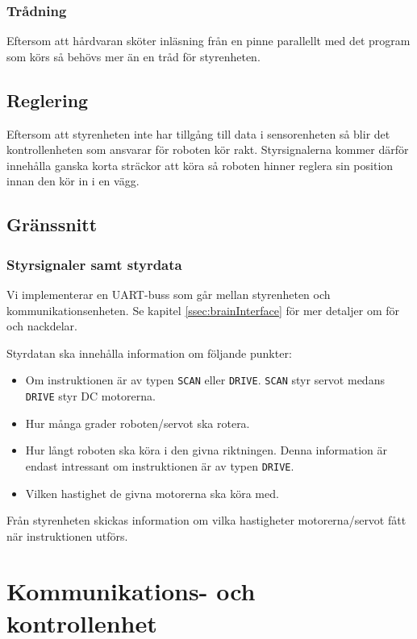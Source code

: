 \documentclass[a4paper,11pt]{article}
\begin{document}
\subsubsection{Trådning}
Eftersom att hårdvaran sköter inläsning från en pinne parallellt med det program som körs så behövs mer än en tråd för styrenheten.

\subsection{Reglering}
Eftersom att styrenheten inte har tillgång till data i sensorenheten så blir det kontrollenheten som ansvarar för roboten kör rakt. Styrsignalerna kommer därför innehålla ganska korta sträckor att köra så roboten hinner reglera sin position innan den kör in i en vägg. 

\subsection{Gränssnitt} \label{ssec:controlInterface}

\subsubsection{Styrsignaler samt styrdata}
Vi implementerar en UART-buss som går mellan styrenheten och kommunikationsenheten. Se kapitel \ref{ssec:brainInterface} för mer detaljer om för och nackdelar.

Styrdatan ska innehålla information om följande punkter:
\begin{itemize}
	\item Om instruktionen är av typen \texttt{SCAN} eller \texttt{DRIVE}. \texttt{SCAN} styr servot medans \texttt{DRIVE} styr DC motorerna.
	\item Hur många grader roboten/servot ska rotera.
	\item Hur långt roboten ska köra i den givna riktningen. Denna information är endast intressant om instruktionen är av typen \texttt{DRIVE}.
	\item Vilken hastighet de givna motorerna ska köra med.
\end{itemize}

Från styrenheten skickas information om vilka hastigheter motorerna/servot fått när instruktionen utförs.

\clearpage
\section{Kommunikations- och kontrollenhet} \label{sec:system3}
\end{document}
